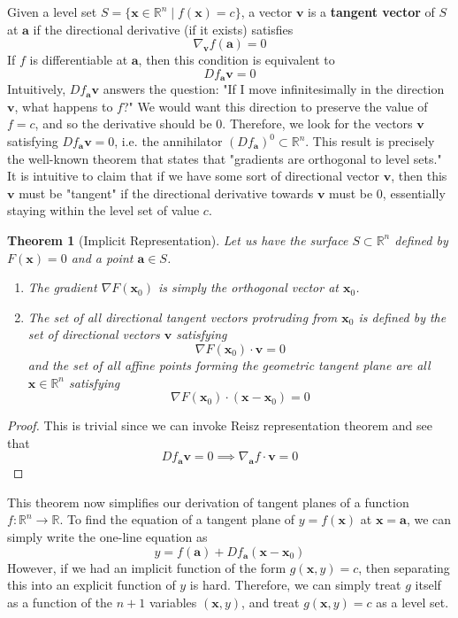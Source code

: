 \documentclass{article}
\newtheorem{theorem}{Theorem}[section]
\theoremstyle{remark}
\theoremstyle{definition}
\begin{document}
Given a level set $S = \{ \mathbf{x} \in \mathbb{R}^n \mid f(\mathbf{x}) = c\}$, a vector $\mathbf{v}$ is a \textbf{tangent vector} of $S$ at $\mathbf{a}$ if the directional derivative (if it exists) satisfies
\[\nabla_\mathbf{v} f (\mathbf{a}) = 0\]
If $f$ is differentiable at $\mathbf{a}$, then this condition is equivalent to 
\[D f_\mathbf{a} \mathbf{v} = 0\]
Intuitively, $D f_\mathbf{a} \mathbf{v}$ answers the question: "If I move infinitesimally in the direction $\mathbf{v}$, what happens to $f$?" We would want this direction to preserve the value of $f = c$, and so the derivative should be $0$. Therefore, we look for the vectors $\mathbf{v}$ satisfying $D f_\mathbf{a} \mathbf{v} = 0$, i.e. the annihilator $(D f_\mathbf{a})^0 \subset \mathbb{R}^n$. This result is precisely the well-known theorem that states that "gradients are orthogonal to level sets." It is intuitive to claim that if we have some sort of directional vector $\mathbf{v}$, then this $\mathbf{v}$ must be "tangent" if the directional derivative towards $\mathbf{v}$ must be $0$, essentially staying within the level set of value $c$. 

\begin{theorem}[Implicit Representation]
Let us have the surface $S \subset \mathbb{R}^n$ defined by $F(\mathbf{x}) = 0$ and a point $\mathbf{a} \in S$. 
\begin{enumerate}
    \item The gradient $\nabla F(\mathbf{x}_0)$ is simply the orthogonal vector at $\mathbf{x}_0$. 
    \item The set of all directional tangent vectors protruding from $\mathbf{x}_0$ is defined by the set of directional vectors $\mathbf{v}$ satisfying 
    \[\nabla F(\mathbf{x}_0) \cdot \mathbf{v} = 0\]
    and the set of all affine points forming the geometric tangent plane are all $\mathbf{x} \in \mathbb{R}^n$ satisfying 
    \[\nabla F(\mathbf{x}_0) \cdot (\mathbf{x} - \mathbf{x}_0) = 0\]
\end{enumerate}
\end{theorem}
\begin{proof}
This is trivial since we can invoke Reisz representation theorem and see that 
\[D f_\mathbf{a} \mathbf{v} = 0 \implies \nabla_\mathbf{a} f \cdot \mathbf{v} = 0\]
\end{proof}

This theorem now simplifies our derivation of tangent planes of a function $f: \mathbb{R}^n \longrightarrow \mathbb{R}$. To find the equation of a tangent plane of $y = f(\mathbf{x})$ at $\mathbf{x} = \mathbf{a}$, we can simply write the one-line equation as 
\[y = f(\mathbf{a}) + D f_{\mathbf{a}} (\mathbf{x} - \mathbf{x}_0)\]
However, if we had an implicit function of the form $g(\mathbf{x}, y) = c$, then separating this into an explicit function of $y$ is hard. Therefore, we can simply treat $g$ itself as a function of the $n+1$ variables $(\mathbf{x}, y)$, and treat $g(\mathbf{x}, y) = c$ as a level set. 
\end{document}
